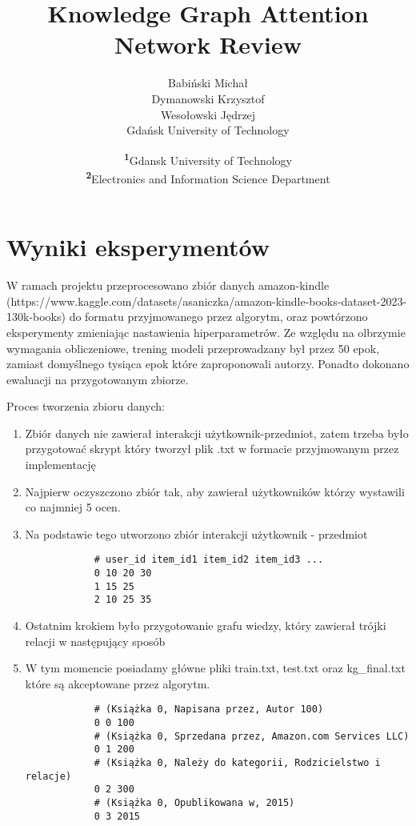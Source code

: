 \documentclass[a4paper,onecolumn]{LTJournalArticle}
\title{Knowledge Graph Attention Network Review}
\author{Babiński Michał \\
        Dymanowski Krzysztof \\
        Wesołowski Jędrzej \\
        Gdańsk University of Technology}
\date{\footnotesize\textsuperscript{\textbf{1}}Gdansk University of Technology\\ \textsuperscript{\textbf{2}}Electronics and Information Science Department}
\begin{document}
	
	\maketitle %
	

	\section{Wyniki eksperymentów}
	W ramach projektu przeprocesowano zbiór danych amazon-kindle (https://www.kaggle.com/datasets/asaniczka/amazon-kindle-books-dataset-2023-130k-books) do formatu przyjmowanego przez algorytm, oraz powtórzono eksperymenty zmieniając nastawienia hiperparametrów. Ze względu na olbrzymie wymagania obliczeniowe, trening modeli przeprowadzany był przez 50 epok, zamiast domyślnego tysiąca epok które zaproponowali autorzy. Ponadto dokonano ewaluacji na przygotowanym zbiorze.
	
	
	Proces tworzenia zbioru danych:
	\begin{enumerate}
		\item Zbiór danych nie zawierał interakcji użytkownik-przedmiot, zatem trzeba było przygotować skrypt który tworzył plik .txt w formacie przyjmowanym przez implementację
		
		\item Najpierw oczyszczono zbiór tak, aby zawierał użytkowników którzy wystawili co najmniej 5 ocen.
		
		\item Na podstawie tego utworzono zbiór interakcji użytkownik - przedmiot  
		
		\begin{verbatim}
			# user_id item_id1 item_id2 item_id3 ...
			0 10 20 30
			1 15 25
			2 10 25 35
		\end{verbatim}

	
		\item Ostatnim krokiem było przygotowanie grafu wiedzy, który zawierał trójki relacji w następujący sposób  

	
		\item W tym momencie posiadamy główne pliki train.txt, test.txt oraz kg\_final.txt które są akceptowane przez algorytm.
		
		\begin{verbatim}
			# (Książka 0, Napisana przez, Autor 100)
			0 0 100   
			# (Książka 0, Sprzedana przez, Amazon.com Services LLC)
			0 1 200   
			# (Książka 0, Należy do kategorii, Rodzicielstwo i relacje)
			0 2 300   
			# (Książka 0, Opublikowana w, 2015)
			0 3 2015  
		\end{verbatim}
	
	\end{enumerate}
\end{document}
